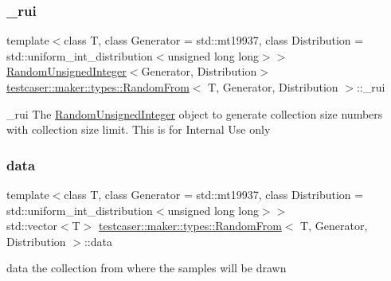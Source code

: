 \subsubsection{\texorpdfstring{\_rui}{\_rui}}
{\footnotesize\ttfamily template$<$class T, class Generator = std\+::mt19937, class Distribution = std\+::uniform\+\_\+int\+\_\+distribution$<$unsigned long long$>$$>$ \\
\mbox{\hyperlink{classtestcaser_1_1maker_1_1types_1_1RandomUnsignedInteger}{Random\+Unsigned\+Integer}}$<$Generator, Distribution$>$ \mbox{\hyperlink{structtestcaser_1_1maker_1_1types_1_1RandomFrom}{testcaser\+::maker\+::types\+::\+Random\+From}}$<$ T, Generator, Distribution $>$\+::\+\_\+rui}



\+\_\+rui The \mbox{\hyperlink{classtestcaser_1_1maker_1_1types_1_1RandomUnsignedInteger}{Random\+Unsigned\+Integer}} object to generate collection size numbers with collection size limit. This is for Internal Use only 

\mbox{\label{structtestcaser_1_1maker_1_1types_1_1RandomFrom_a1f346e06890d0451607551dcb0e3a426}} 
\subsubsection{\texorpdfstring{data}{data}}
{\footnotesize\ttfamily template$<$class T, class Generator = std\+::mt19937, class Distribution = std\+::uniform\+\_\+int\+\_\+distribution$<$unsigned long long$>$$>$ \\
std\+::vector$<$T$>$ \mbox{\hyperlink{structtestcaser_1_1maker_1_1types_1_1RandomFrom}{testcaser\+::maker\+::types\+::\+Random\+From}}$<$ T, Generator, Distribution $>$\+::data}



data the collection from where the samples will be drawn 

\mbox{\label{structtestcaser_1_1maker_1_1types_1_1RandomFrom_a4701553931d6eafed7f3070fa64924b7}} 

